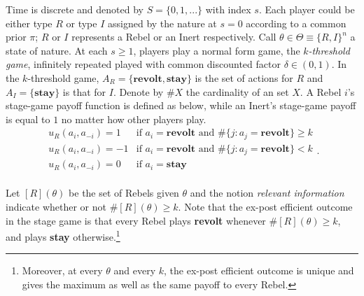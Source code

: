 \documentclass[12pt,letter]{article}
\theoremstyle{definition}
\theoremstyle{remark}
\theoremstyle{claim}
\begin{document}
Time is discrete and denoted by $S=\{0,1,...\}$ with index $s$. Each player could be either type $R$ or type $I$ assigned by the nature at $s=0$ according to a common prior $\pi$; $R$ or $I$ represents a Rebel or an Inert respectively. Call $\theta\in \Theta\equiv \{R,I\}^n$ a state of nature. At each $s\geq 1$, players play a normal form game, the \textit{$k$-threshold game}, infinitely repeated played with common discounted factor $\delta\in (0,1)$. In the $k$-threshold game, $A_R=\{\textbf{revolt}, \textbf{stay}\}$ is the set of actions for $R$ and $A_I=\{\textbf{stay}\}$ is that for $I$. Denote by $\#X$ the cardinality of an set $X$. A Rebel $i$'s stage-game payoff function is defined as below, while an Inert's stage-game payoff is equal to $1$ no matter how other players play. 
\[   
\begin{array}{ll}
      u_{R}(a_{i},a_{-i})=1 & \text{if $a_{i}=\textbf{revolt}$ and $\#\{j:a_{j}=\textbf{revolt}\}\geq k$} \\
      u_{R}(a_{i},a_{-i})=-1 & \text{if $a_{i}=\textbf{revolt}$ and $\#\{j:a_{j}=\textbf{revolt}\}< k$} \\
      u_{R}(a_{i},a_{-i})=0 & \text{if $a_{i}=\textbf{stay}$} \\
\end{array} 
. \]


Let $[R](\theta)$ be the set of Rebels given $\theta$ and the notion \textit{relevant information} indicate whether or not $\#[R](\theta)\geq k$. Note that the ex-post efficient outcome in the stage game is that every Rebel plays \textbf{revolt} whenever $\#[R](\theta)\geq k$, and plays \textbf{stay} otherwise.\footnote{Moreover, at every $\theta$ and every $k$, the ex-post efficient outcome is unique and gives the maximum as well as the same payoff to every Rebel.} 
\end{document}
